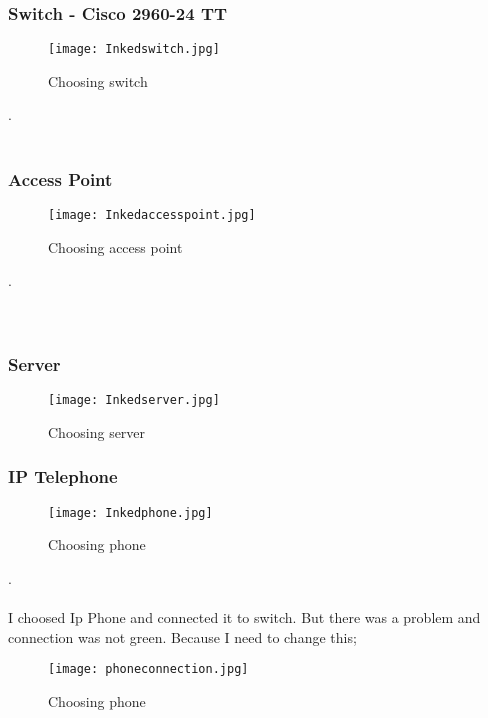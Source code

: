 \documentclass[onecolumn]{article}
\begin{document}
\subsubsection{ Switch - Cisco 2960-24 TT}
\label{sec:2.0.1}

\begin{figure}[ht!]
\centering
\texttt{[image: Inkedswitch.jpg]}
\caption{Choosing switch \label{}}
\end{figure}
.\\\\

\subsubsection{Access Point}
\label{sec:2.0.2}

\begin{figure}[ht!]
\centering
\texttt{[image: Inkedaccesspoint.jpg]}
\caption{Choosing access point  \label{sec:2.0.2}}
\end{figure}


.\\\\\\
\subsubsection{Server}
\label{sec:2.0.3}

\begin{figure}[ht!]
\centering
\texttt{[image: Inkedserver.jpg]}
\caption{Choosing server \label{}}
\end{figure}



\subsubsection{IP Telephone}
\label{sec:2.0.5}

\begin{figure}[ht!]
\centering
\texttt{[image: Inkedphone.jpg]}
\caption{Choosing phone \label{sec:2.0.5}}
\end{figure}
.\\\\
I choosed Ip Phone and connected it to switch. But there was a problem and connection was not green. Because I need to change this;

\begin{figure}[ht!]
\centering
\texttt{[image: phoneconnection.jpg]}
\caption{Choosing phone \label{}}
\end{figure}
\end{document}
